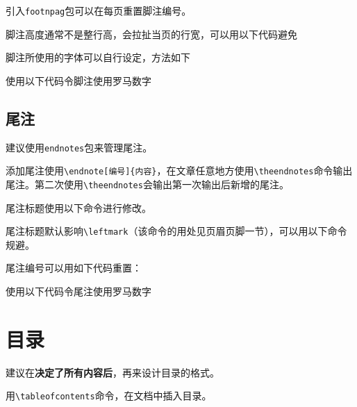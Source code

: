 \documentclass[10pt,openany]{book}
\begin{document}


引入\texttt{footnpag}包可以在每页重置脚注编号。



脚注高度通常不是整行高，会拉扯当页的行宽，可以用以下代码避免



脚注所使用的字体可以自行设定，方法如下



使用以下代码令脚注使用罗马数字



\section{尾注}

建议使用\texttt{endnotes}包来管理尾注。

添加尾注使用\texttt{\textbackslash{}endnote[编号]\{内容\}}，在文章任意地方使用\texttt{\textbackslash{}theendnotes}命令输出尾注。第二次使用\texttt{\textbackslash{}theendnotes}会输出第一次输出后新增的尾注。

尾注标题使用以下命令进行修改。



尾注标题默认影响\texttt{\textbackslash{}leftmark}（该命令的用处见页眉页脚一节），可以用以下命令规避。



尾注编号可以用如下代码重置：



使用以下代码令尾注使用罗马数字



\chapter{目录}

建议在\textbf{决定了所有内容后}，再来设计目录的格式。

用\texttt{\textbackslash{}tableofcontents}命令，在文档中插入目录。
\end{document}
